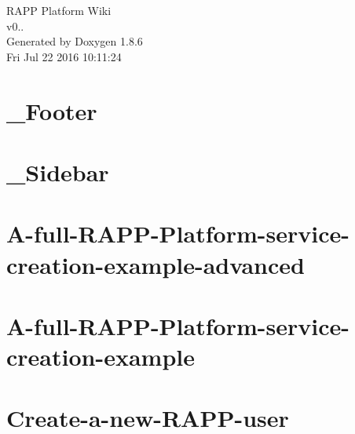 \documentclass[twoside]{book}
\newcommand{\clearemptydoublepage}{%
  \newpage{\pagestyle{empty}\cleardoublepage}%
}
\begin{document}
\hypersetup{pageanchor=false}
\begin{titlepage}
\vspace*{7cm}
\begin{center}%
{\Large R\-A\-P\-P Platform Wiki \\[1ex]\large v0.. }\\
\vspace*{1cm}
{\large Generated by Doxygen 1.8.6}\\
\vspace*{0.5cm}
{\small Fri Jul 22 2016 10:11:24}\\
\end{center}
\end{titlepage}
\clearemptydoublepage
\tableofcontents
\clearemptydoublepage
{}
\hypersetup{pageanchor=true}

\chapter{\-\_\-\-Footer}
\label{md_rapp-platform_8wiki__Footer}
\hypertarget{md_rapp-platform_8wiki__Footer}{}

\chapter{\-\_\-\-Sidebar}
\label{md_rapp-platform_8wiki__Sidebar}
\hypertarget{md_rapp-platform_8wiki__Sidebar}{}

\chapter{A-\/full-\/\-R\-A\-P\-P-\/\-Platform-\/service-\/creation-\/example-\/advanced}
\label{md_rapp-platform_8wiki_A-full-RAPP-Platform-service-creation-example-advanced}
\hypertarget{md_rapp-platform_8wiki_A-full-RAPP-Platform-service-creation-example-advanced}{}

\chapter{A-\/full-\/\-R\-A\-P\-P-\/\-Platform-\/service-\/creation-\/example}
\label{md_rapp-platform_8wiki_A-full-RAPP-Platform-service-creation-example}
\hypertarget{md_rapp-platform_8wiki_A-full-RAPP-Platform-service-creation-example}{}

\chapter{Create-\/a-\/new-\/\-R\-A\-P\-P-\/user}
\label{md_rapp-platform_8wiki_Create-a-new-RAPP-user}
\hypertarget{md_rapp-platform_8wiki_Create-a-new-RAPP-user}{}

\end{document}
